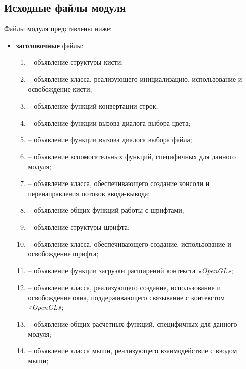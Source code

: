 \subsection{Исходные файлы модуля }

Файлы модуля представлены ниже:

\begin{itemize}[label=---]
    \item \textbf{заголовочные} файлы:
    \begin{enumerate}[label=\arabic*), labelsep=0.5em]
        \item {} -- объявление структуры кисти;
        \item {} -- объявление класса, реализующего инициализацию, использование и освобождение кисти;
        \item {} -- объявление функций конвертации строк;
        \item {} -- объявление функции вызова диалога выбора цвета;
        \item {} -- объявление функции вызова диалога выбора файла;
        \item {} -- объявление вспомогательных функций, специфичных для данного модуля;
        \item {} -- объявление класса, обеспечивающего создание консоли и перенаправления потоков ввода-вывода;
        \item {} -- объявление общих функций работы с шрифтами;
        \item {} -- объявление структуры шрифта;
        \item {} -- объявление класса, обеспечивающего создание, использование и освобождение шрифта;
        \item {} -- объявление функции загрузки расширений контекста \textit{«OpenGL»};
        \item {} -- объявление класса, реализующего создание, использование и освобождение окна, поддерживающего связывание с контекстом \textit{«OpenGL»}; 
        \item {} -- объявление общих расчетных функций, специфичных для данного модуля;
        \item {} -- объявление класса мыши, реализующего взаимодействие с вводом мыши;

\end{enumerate}
\end{itemize}
